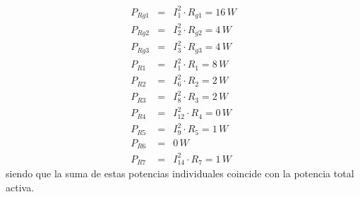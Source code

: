 \documentclass[10pt]{article}
\begin{document}
\begin{eqnarray*}
P_{Rg1} & = & I_{1}^{2}\cdot R_{g1}=16\, W\\
P_{Rg2} & = & I_{2}^{2}\cdot R_{g2}=4\, W\\
P_{Rg3} & = & I_{3}^{2}\cdot R_{g3}=4\, W\\
P_{R1} & = & I_{1}^{2}\cdot R_{1}=8\, W\\
P_{R2} & = & I_{6}^{2}\cdot R_{2}=2\, W\\
P_{R3} & = & I_{8}^{2}\cdot R_{3}=2\, W\\
P_{R4} & = & I_{12}^{2}\cdot R_{4}=0\, W\\
P_{R5} & = & I_{9}^{2}\cdot R_{5}=1\, W\\
P_{R6} & = & 0\, W\\
P_{R7} & = & I_{14}^{2}\cdot R_{7}=1\, W
\end{eqnarray*}
siendo que la suma de estas potencias individuales coincide con la
potencia total activa.
\end{document}
